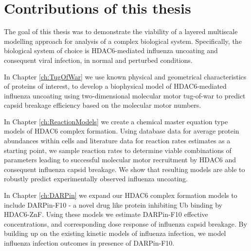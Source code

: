 \section{Contributions of this thesis}

The goal of this thesis was to demonstrate the viability of a layered multiscale modelling approach for analysis of a complex biological system. Specifically, the biological system of choice is HDAC6-mediated influenza uncoating and consequent viral infection, in normal and perturbed conditions.

In Chapter \ref{ch:TugOfWar} we use known physical and geometrical characteristics of proteins of interest, to develop a biophysical model of HDAC6-mediated influenza uncoating using two-dimensional molecular motor tug-of-war to predict capsid breakage efficiency based on the molecular motor numbers.

In Chapter \ref{ch:ReactionModels} we create a chemical master equation type models of HDAC6 complex formation. Using database data for average protein abundances within cells and literature data for reaction rates estimates as a starting point, we sample reaction rates to determine viable combinations of parameters leading to successful molecular motor recruitment by HDAC6 and consequent influenza capsid breakage. We show that resulting models are able to robustly predict experimentally observed influenza uncoating.

In Chapter \ref{ch:DARPin} we expand our HDAC6 complex formation models to include DARPin-F10 - a novel drug like protein inhibiting Ub binding by HDAC6-ZnF. Using these models we estimate DARPin-F10 effective concentrations, and corresponding dose response of influenza capsid breakage. By building up on the existing kinetic models of influenza infection, we model influenza infection outcomes in presence of DARPin-F10.